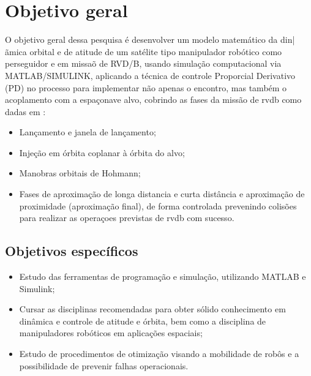 \section{Objetivo geral}

O objetivo geral dessa pesquisa  é desenvolver um modelo matemático da din|ãmica orbital e de atitude de um satélite  tipo manipulador robótico como perseguidor e em missaõ de RVD/B, usando simulação computacional via MATLAB/SIMULINK, aplicando a técnica de controle Proporcial Derivativo (PD) no processo para implementar não apenas o encontro, mas também o acoplamento com a espaçonave alvo, cobrindo as fases da missão de \gls{rvdb} como dadas em \cite{fehse2003}:

\begin{itemize}
    \item Lançamento e janela de lançamento;
    \item Injeção em órbita coplanar à órbita do alvo;
    \item Manobras orbitais de Hohmann;
    \item Fases de aproximação de longa distancia e curta distância e aproximação de proximidade (aproximação final), de forma controlada prevenindo colisões para realizar as operaçoes previstas de \gls{rvdb} com sucesso.
\end{itemize}

\subsection{Objetivos específicos}


\begin{itemize}
    \item Estudo das ferramentas de programação e simulação, utilizando MATLAB e Simulink;
    \item Cursar as disciplinas recomendadas para obter sólido conhecimento em dinâmica e controle de atitude e órbita, bem como a disciplina de manipuladores robóticos em aplicações espaciais;
    \item Estudo de procedimentos de otimização visando a mobilidade de robôs e a possibilidade de prevenir falhas operacionais.
\end{itemize}